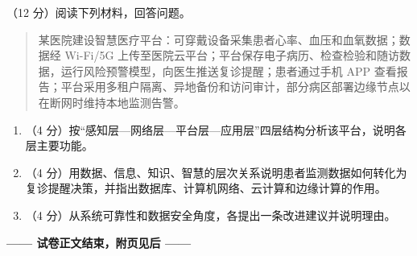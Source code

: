 \documentclass[a4paper,11pt]{article}
\begin{document}

\q （12 分）阅读下列材料，回答问题。
\begin{quote}\small
某医院建设智慧医疗平台：可穿戴设备采集患者心率、血压和血氧数据；数据经 Wi-Fi/5G 上传至医院云平台；平台保存电子病历、检查检验和随访数据，运行风险预警模型，向医生推送复诊提醒；患者通过手机 APP 查看报告；平台采用多租户隔离、异地备份和访问审计，部分病区部署边缘节点以在断网时维持本地监测告警。
\end{quote}
\begin{enumerate}[label=（\arabic*）, leftmargin=2.4em, itemsep=1pt]
  \item （4 分）按“感知层—网络层—平台层—应用层”四层结构分析该平台，说明各层主要功能。
  \item （4 分）用数据、信息、知识、智慧的层次关系说明患者监测数据如何转化为复诊提醒决策，并指出数据库、计算机网络、云计算和边缘计算的作用。
  \item （4 分）从系统可靠性和数据安全角度，各提出一条改进建议并说明理由。
\end{enumerate}
\anslines{12cm}

\vfill
\begin{center}
\textbf{—— 试卷正文结束，附页见后 ——}
\end{center}

\end{document}
